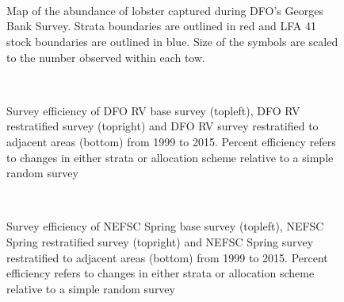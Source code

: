 \documentclass[11pt]{article}
\newcommand{\D}{.}
\newcommand{\e}{/backup/bio_data/bio.lobster/figures/} %
\begin{document}
\begin{figure}
\centering
{}
\\
\\
\\

 \caption{Map of the abundance of lobster captured during DFO's Georges Bank Survey. Strata boundaries are outlined in red and LFA 41 stock boundaries are outlined in blue. Size of the symbols are scaled to the number observed within each tow.}
\end{figure}
\clearpage




\begin{figure}
\centering
{}
\\
\caption{Survey efficiency of DFO RV base survey (topleft), DFO RV restratified survey (topright) and DFO RV survey restratified to adjacent areas (bottom) from 1999 to 2015. Percent efficiency refers to changes in either strata or allocation scheme relative to a simple random survey }
\end{figure}
\clearpage



\begin{figure}
\centering
{}
\\
\caption{Survey efficiency of NEFSC Spring base survey (topleft), NEFSC Spring restratified survey (topright) and NEFSC Spring survey restratified to adjacent areas (bottom) from 1999 to 2015. Percent efficiency refers to changes in either strata or allocation scheme relative to a simple random survey }
\end{figure}
\clearpage
\end{document}
